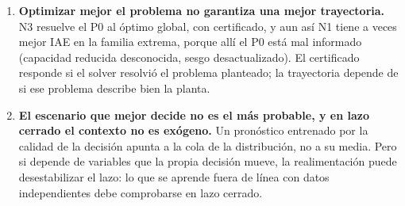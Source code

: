 \begin{enumerate}
        respecto de qué está normalizado.
  \item \textbf{Optimizar mejor el problema no garantiza una mejor trayectoria.} N3 resuelve el
        P0 al óptimo global, con certificado, y aun así N1 tiene a veces mejor IAE en la familia
        extrema, porque allí el P0 está mal informado (capacidad reducida desconocida, sesgo
        desactualizado). El certificado responde si el solver resolvió el problema planteado;
        la trayectoria depende de si ese problema describe bien la planta.
  \item \textbf{El escenario que mejor decide no es el más probable, y en lazo cerrado el
        contexto no es exógeno.} Un pronóstico entrenado por la calidad de la decisión apunta a
        la cola de la distribución, no a su media. Pero si depende de variables que la propia
        decisión mueve, la realimentación puede desestabilizar el lazo: lo que se aprende fuera
        de línea con datos independientes debe comprobarse en lazo cerrado.
\end{enumerate}

